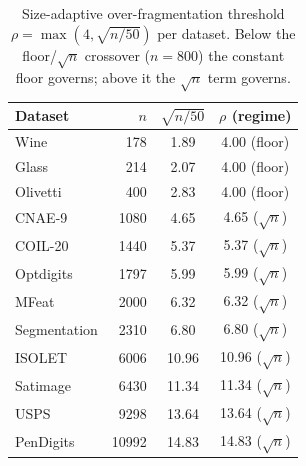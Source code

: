 \begin{table}[htbp]
\centering
\caption{Size-adaptive over-fragmentation threshold $\rho=\max(4,\sqrt{n/50})$ per dataset. Below the floor/$\sqrt{n}$ crossover ($n{=}800$) the constant floor governs; above it the $\sqrt{n}$ term governs.}
\label{tab:rho}
\footnotesize
\setlength{\tabcolsep}{4pt}
\begin{tabular}{lrcc}
\toprule
Dataset & $n$ & $\sqrt{n/50}$ & $\rho$ (regime) \\
\midrule
Wine         & 178   & 1.89  & 4.00 (floor) \\
Glass        & 214   & 2.07  & 4.00 (floor) \\
Olivetti     & 400   & 2.83  & 4.00 (floor) \\
CNAE-9       & 1080  & 4.65  & 4.65 ($\sqrt{n}$) \\
COIL-20      & 1440  & 5.37  & 5.37 ($\sqrt{n}$) \\
Optdigits    & 1797  & 5.99  & 5.99 ($\sqrt{n}$) \\
MFeat        & 2000  & 6.32  & 6.32 ($\sqrt{n}$) \\
Segmentation & 2310  & 6.80  & 6.80 ($\sqrt{n}$) \\
ISOLET       & 6006  & 10.96 & 10.96 ($\sqrt{n}$) \\
Satimage     & 6430  & 11.34 & 11.34 ($\sqrt{n}$) \\
USPS         & 9298  & 13.64 & 13.64 ($\sqrt{n}$) \\
PenDigits    & 10992 & 14.83 & 14.83 ($\sqrt{n}$) \\
\bottomrule
\end{tabular}
\end{table}
